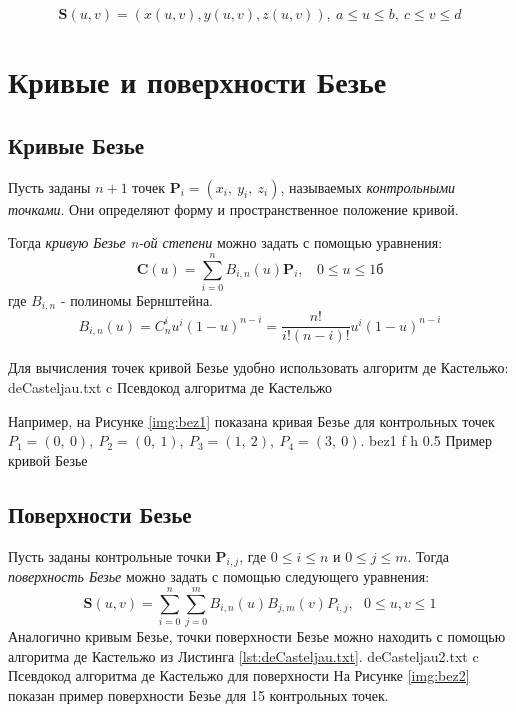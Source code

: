\documentclass{bmstu}
\begin{document}
\begin{equation}
    \mathbf{S}(u, v) = (x(u, v), y(u, v), z(u, v)),~        a \le u \le b,~c \le v \le d
\end{equation}

\section{Кривые и поверхности Безье}

\subsection{Кривые Безье}

Пусть заданы $n+1$ точек $\mathbf{P}_i = (x_i,~y_i,~z_i)$, называемых \textit{контрольными точками}. Они определяют форму и пространственное положение кривой.

Тогда \textit{кривую Безье n-ой степени} можно задать с помощью уравнения:
\begin{equation}
    \mathbf{C}(u) = \sum\limits_{i=0}^n B_{i, n}(u)\mathbf{P}_i,~~~~ 0\le u\le 1б
\end{equation}
где $B_{i, n}$ - полиномы Бернштейна.
\begin{equation}
    B_{i, n}(u) = C^i_nu^i(1-u)^{n-i} = \frac{n!}{i!(n-i)!}u^i(1-u)^{n-i}
\end{equation}

Для вычисления точек кривой Безье удобно использовать алгоритм де Кастельжо:
{deCasteljau.txt} %
{c} %
{Псевдокод алгоритма де Кастельжо} %

Например, на Рисунке \ref{img:bez1} показана кривая Безье для контрольных точек $P_1 = (0,~0),~P_2=(0,~1),~P_3=(1,~2),~P_4=(3,~0)$.
{bez1} %
{f} %
{h} %
{0.5\textwidth} %
{Пример кривой Безье} %

\subsection{Поверхности Безье}

Пусть заданы контрольные точки $\mathbf{P}_{i,j}$, где $0 \le i \le n$ и $0 \le j \le m$.
Тогда \textit{поверхность Безье} можно задать с помощью следующего уравнения:
\begin{equation}
    \mathbf{S}(u,v)=\sum\limits_{i=0}^n\sum\limits_{j=0}^m B_{i,n}(u)B_{j,m}(v)P_{i,j},~~~ 0\le u,v\le 1
\end{equation}
Аналогично кривым Безье, точки поверхности Безье можно находить с помощью алгоритма де Кастельжо из Листинга \ref{lst:deCasteljau.txt}.
{deCasteljau2.txt} %
{c} %
{Псевдокод алгоритма де Кастельжо для поверхности} %
На Рисунке \ref{img:bez2} показан пример поверхности Безье для 15 контрольных точек.
\end{document}
